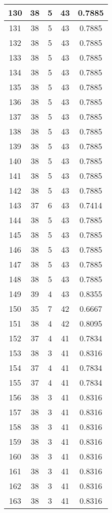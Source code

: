 \documentclass[letterpaper, 12pt]{article}
\begin{document}
\begin{longtable}{|c|c|c|c|c|}
\hline
130 & 38 & 5 & 43 & 0.7885 \\
\hline
131 & 38 & 5 & 43 & 0.7885 \\
\hline
132 & 38 & 5 & 43 & 0.7885 \\
\hline
133 & 38 & 5 & 43 & 0.7885 \\
\hline
134 & 38 & 5 & 43 & 0.7885 \\
\hline
135 & 38 & 5 & 43 & 0.7885 \\
\hline
136 & 38 & 5 & 43 & 0.7885 \\
\hline
137 & 38 & 5 & 43 & 0.7885 \\
\hline
138 & 38 & 5 & 43 & 0.7885 \\
\hline
139 & 38 & 5 & 43 & 0.7885 \\
\hline
140 & 38 & 5 & 43 & 0.7885 \\
\hline
141 & 38 & 5 & 43 & 0.7885 \\
\hline
142 & 38 & 5 & 43 & 0.7885 \\
\hline
143 & 37 & 6 & 43 & 0.7414 \\
\hline
144 & 38 & 5 & 43 & 0.7885 \\
\hline
145 & 38 & 5 & 43 & 0.7885 \\
\hline
146 & 38 & 5 & 43 & 0.7885 \\
\hline
147 & 38 & 5 & 43 & 0.7885 \\
\hline
148 & 38 & 5 & 43 & 0.7885 \\
\hline
149 & 39 & 4 & 43 & 0.8355 \\
\hline
150 & 35 & 7 & 42 & 0.6667 \\
\hline
151 & 38 & 4 & 42 & 0.8095 \\
\hline
152 & 37 & 4 & 41 & 0.7834 \\
\hline
153 & 38 & 3 & 41 & 0.8316 \\
\hline
154 & 37 & 4 & 41 & 0.7834 \\
\hline
155 & 37 & 4 & 41 & 0.7834 \\
\hline
156 & 38 & 3 & 41 & 0.8316 \\
\hline
157 & 38 & 3 & 41 & 0.8316 \\
\hline
158 & 38 & 3 & 41 & 0.8316 \\
\hline
159 & 38 & 3 & 41 & 0.8316 \\
\hline
160 & 38 & 3 & 41 & 0.8316 \\
\hline
161 & 38 & 3 & 41 & 0.8316 \\
\hline
162 & 38 & 3 & 41 & 0.8316 \\
\hline
163 & 38 & 3 & 41 & 0.8316 \\

\end{longtable}
\end{document}
